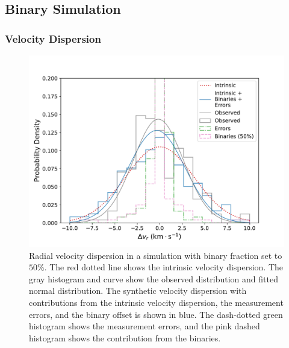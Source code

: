 \documentclass[12pt]{ucsddissertation}
\begin{document}
\begin{CJK*}{UTF8}{gbsn}
\subsection{Binary Simulation}
\label{onc-subsec:binary simulation}

\subsubsection{Velocity Dispersion}
\begin{figure}[htb!]
    \centering
    \includegraphics[width=\linewidth]{figures/chapter1/Binary_Simulation_Histogram.pdf}
    \caption[Radial velocity dispersion distribution of binary simulation]{Radial velocity dispersion in a simulation with binary fraction set to $50\%$. The red dotted line shows the intrinsic velocity dispersion. The gray histogram and curve show the observed distribution and fitted normal distribution. The synthetic velocity dispersion with contributions from the intrinsic velocity dispersion, the measurement errors, and the binary offset is shown in blue. The dash-dotted green histogram shows the measurement errors, and the pink dashed histogram shows the contribution from the binaries.}
    \label{fig:binary histogram}
\end{figure}


\end{CJK*}
\end{document}
